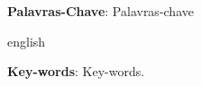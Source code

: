 \documentclass[
	12pt,				%
	openright,			%
	twoside,			%
	a4paper,			%
	english,			%
	french,				%
	spanish,			%
	brazil,				%
	]{abntex2}
\begin{document}
\frenchspacing 


\imprimircapa

\imprimirfolhaderosto




\setlength{\absparsep}{18pt} %
\begin{resumo}
	

	\vspace{\onelineskip}

	\noindent 
	\textbf{Palavras-Chave}: Palavras-chave
\end{resumo}

\begin{resumo}[Abstract]
	\begin{otherlanguage*}{english}
		

		\vspace{\onelineskip}
		
		\noindent 
		\textbf{Key-words}: Key-words.
	\end{otherlanguage*}
\end{resumo}

\listoffigures*
\cleardoublepage
\end{document}
